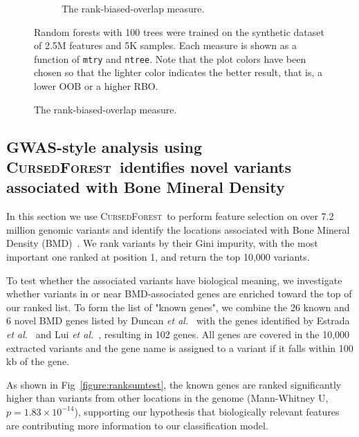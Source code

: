 \documentclass[10pt,letterpaper]{article}
\newcommand{\cursedforest}{\textsc{CursedForest}\xspace}
\newcommand{\mtry}{\texttt{mtry}\xspace}
\newcommand{\ntree}{\texttt{ntree}\xspace}
\begin{document}
\begin{figure}[tbhp]
\begin{adjustwidth}{-1.00in}{0in}
\begin{subfigure}[b]{0.5\linewidth}
      \caption{The rank-biased-overlap measure.} 
      \label{figure:rbo-prod.png} 
    \end{subfigure} 
    \begin{flushleft} 
      Random forests with 100 trees were trained on the synthetic dataset of 2.5M features and 5K samples.
      Each measure is shown as a function of \mtry and \ntree. Note that the plot colors have been chosen so that the lighter color indicates
      the better result, that is, a lower OOB or a higher RBO.
    \end{flushleft}
  \end{adjustwidth}
\end{figure}

\subsection{GWAS-style analysis using \cursedforest\ identifies novel variants associated with Bone Mineral Density}
In this section we use \cursedforest\ to perform feature selection on over 7.2 million genomic variants and identify the
locations associated with Bone Mineral Density (BMD)~\cite{Duncan.2011}. 
We rank variants by their Gini impurity, with the most important one ranked at position 1, and return the top 10,000 variants.

To test whether the associated variants have biological meaning, we investigate whether variants in or near
BMD-associated genes are enriched toward the top of our ranked list. To form the list of "known genes", we
combine the 26 known and 6 novel BMD genes listed by Duncan {\it et al.}~\cite{Duncan.2011} with the genes identified by
Estrada {\it et al.}~\cite{Estrada2012} and Lui {\it et al.}~\cite{Liu2008}, resulting in 102 genes.  All genes are covered in the
10,000 extracted variants and the gene name is assigned to a variant if it falls within 100 kb of the gene.

As shown in Fig~\ref{figure:ranksumtest}, the known genes are ranked significantly higher than variants from other
locations in the genome (Mann-Whitney U, $p=1.83\times10^{-14}$), supporting our hypothesis that biologically relevant
features are contributing more information to our classification model.
\end{document}
